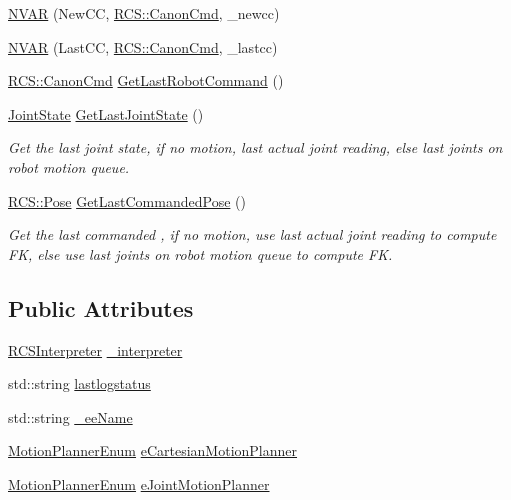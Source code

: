 \begin{DoxyCompactItemize}
\hyperlink{structRCS_1_1CController_a5113cb8a1cfaf75459e8a2b13802312e}{N\-V\-A\-R} (New\-C\-C, \hyperlink{structRCS_1_1CanonCmd}{R\-C\-S\-::\-Canon\-Cmd}, \-\_\-newcc)
\item 
\hyperlink{structRCS_1_1CController_a1b85d1d02e33dbfe25173575f17d4498}{N\-V\-A\-R} (Last\-C\-C, \hyperlink{structRCS_1_1CanonCmd}{R\-C\-S\-::\-Canon\-Cmd}, \-\_\-lastcc)
\item 
\hyperlink{structRCS_1_1CanonCmd}{R\-C\-S\-::\-Canon\-Cmd} \hyperlink{structRCS_1_1CController_af150048fb1660e68d9f5ec1043494ea9}{Get\-Last\-Robot\-Command} ()
\item 
\hyperlink{RCS_8h_aa4adb93a26caa4dacba9c9614e283245}{Joint\-State} \hyperlink{structRCS_1_1CController_a7334e3abcc69cc6e3a9f82e59c682551}{Get\-Last\-Joint\-State} ()
\begin{DoxyCompactList}\small\item\em Get the last joint state, if no motion, last actual joint reading, else last joints on robot motion queue. \end{DoxyCompactList}\item 
\hyperlink{namespaceRCS_aa07e45d8a50e30064283d2b38087f999}{R\-C\-S\-::\-Pose} \hyperlink{structRCS_1_1CController_ae7230e4ecd977fb1519b13b2ed696897}{Get\-Last\-Commanded\-Pose} ()
\begin{DoxyCompactList}\small\item\em Get the last commanded , if no motion, use last actual joint reading to compute F\-K, else use last joints on robot motion queue to compute F\-K. \end{DoxyCompactList}\end{DoxyCompactItemize}
\subsection*{Public Attributes}
\begin{DoxyCompactItemize}
\item 
\hyperlink{classRCSInterpreter}{R\-C\-S\-Interpreter} \hyperlink{structRCS_1_1CController_a4c3c287cebfd9fa9fb413205fa0b49f6}{\-\_\-interpreter}
\item 
std\-::string \hyperlink{structRCS_1_1CController_a8bd2705747d1e16f5806ddf183bfade7}{lastlogstatus}
\item 
std\-::string \hyperlink{structRCS_1_1CController_af21d09514563cd2bb2d0d0a5b001d205}{\-\_\-ee\-Name}
\item 
\hyperlink{structRCS_1_1CController_a50ede7cd9f47204828f0f7c740dc09b1}{Motion\-Planner\-Enum} \hyperlink{structRCS_1_1CController_a4174fd5467045e780fe53bde42e70735}{e\-Cartesian\-Motion\-Planner}
\item 
\hyperlink{structRCS_1_1CController_a50ede7cd9f47204828f0f7c740dc09b1}{Motion\-Planner\-Enum} \hyperlink{structRCS_1_1CController_ad788d0def2101be74b680394bcbc78e7}{e\-Joint\-Motion\-Planner}
\end{DoxyCompactItemize}
